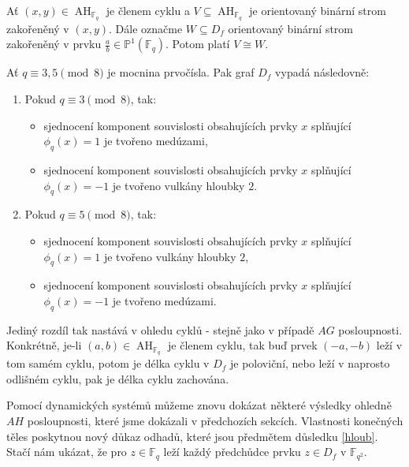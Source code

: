 \documentclass[12pt]{report}
\DeclareMathOperator{\AH}{AH}
\begin{document}
\begin{dusledek}\label{co}
Ať $(x,y) \in \AH_{\mathbb{F}_q}$ je členem cyklu a $V \subseteq \AH_{\mathbb{F}_q}$ je orientovaný binární strom zakořeněný v $(x,y)$. Dále označme $W \subseteq D_f$ orientovaný binární strom zakořeněný v prvku $\frac{a}{b} \in \mathbb{P}^{1}(\mathbb{F}_q)$. Potom platí $V \cong W$.
\end{dusledek}
\begin{dusledek}
Ať $q \equiv 3,5 \pmod{8}$ je mocnina prvočísla. Pak graf $D_f$ vypadá následovně:
\begin{enumerate}
\item Pokud $q \equiv 3 \pmod{8}$, tak:
\begin{itemize}
\item sjednocení komponent souvislosti obsahujících prvky $x$ splňující $\phi_q(x) = 1$ je tvořeno medúzami,
\item sjednocení komponent souvislosti obsahujících prvky $x$ splňující $\phi_q(x) = -1$ je tvořeno vulkány hloubky $2$.
\end{itemize}
\item Pokud $q \equiv 5 \pmod{8}$, tak:
\begin{itemize}
\item sjednocení komponent souvislosti obsahujících prvky $x$ splňující $\phi_q(x) = 1$ je tvořeno vulkány hloubky $2$,
\item sjednocení komponent souvislosti obsahujících prvky $x$ splňující $\phi_q(x) = -1$ je tvořeno medúzami.
\end{itemize}
\end{enumerate}
\end{dusledek}

 Jediný rozdíl tak nastává v ohledu cyklů - stejně jako v případě $AG$ posloupnosti. Konkrétně, je-li $(a,b) \in \AH_{\mathbb{F}_q}$ je členem cyklu, tak buď prvek $(-a,-b)$ leží v tom samém cyklu, potom je délka cyklu v $D_f$ je poloviční, nebo leží v naprosto odlišném cyklu, pak je délka cyklu zachována.

Pomocí dynamických systémů můžeme znovu dokázat některé výsledky ohledně $AH$ posloupnosti, které jsme dokázali v předchozích sekcích. Vlastnosti konečných těles poskytnou nový důkaz odhadů, které jsou předmětem důsledku \ref{hloub}. Stačí nám ukázat, že pro $z \in \mathbb{F}_q$ leží každý předchůdce prvku $z \in D_f$ v $\mathbb{F}_{q^2}$. 
\end{document}
